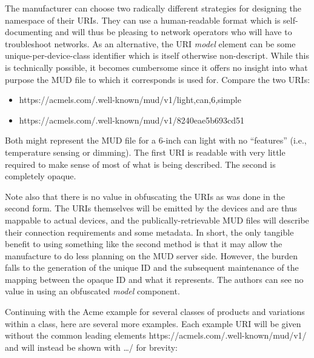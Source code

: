 \documentclass[conference]{IEEEtran}
\begin{document}
The manufacturer can choose two radically different strategies for
designing the namespace of their URIs.  They can use a human-readable
format which is self-documenting and will thus be pleasing to network
operators who will have to troubleshoot networks.  As an alternative,
the URI {\em model} element can be some unique-per-device-class
identifier which is itself otherwise non-descript.  While this is
technically possible, it becomes cumbersome since it offers no insight
into what purpose the MUD file to which it corresponds is used for.
Compare the two URIs:
\begin{itemize}
\item {\ttfamily\scriptsize
  https://acmels.com/.well-known/mud/v1/light,can,6,simple}
\item {\ttfamily\scriptsize
  https://acmels.com/.well-known/mud/v1/8240eae5b693cd51}
\end{itemize}
Both might represent the MUD file for a 6-inch can light with no
``features'' (i.e., temperature sensing or dimming).  The first URI is
readable with very little required to make sense of most of what is
being described.  The second is completely opaque.

Note also that there is no value in obfuscating the URIs as was done
in the second form.  The URIs themselves will be emitted by the
devices and are thus mappable to actual devices, and the
publically-retrievable MUD files will describe their connection
requirements and some metadata.  In short, the only tangible benefit
to using something like the second method is that it may allow the
manufacture to do less planning on the MUD server side.  However, the
burden falls to the generation of the unique ID and the subsequent
maintenance of the mapping between the opaque ID and what it
represents.  The authors can see no value in using an obfuscated {\em
  model} component.

Continuing with the Acme example for several classes of products and
variations within a class, here are several more examples.  Each
example URI will be given without the common leading elements
{\ttfamily\scriptsize https://acmels.com/.well-known/mud/v1/} and will
instead be shown with {\ttfamily\scriptsize \ldots/} for brevity:
\end{document}
